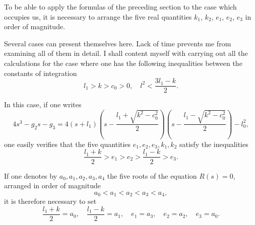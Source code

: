 \documentclass{article}
\begin{document}
To be able to apply the formulas of the preceding section to the case which occupies us, it is necessary to arrange the five real quantities $k_1$, $k_2$, $e_1$, $e_2$, $e_3$ in order of magnitude.

Several cases can present themselves here. Lack of time prevents me from examining all of them in detail. I shall content myself with carrying out all the calculations for the case where one has the following inequalities between the constants of integration
\[
l_1 > k > c_0 > 0, \quad l^2 < \frac{3l_1 - k}{2}.
\]

In this case, if one writes
\[
4s^3 - g_2s - g_3 = 4(s + l_1)\left(s - \frac{l_1 + \sqrt{k^2 - c_0^2}}{2}\right)\left(s - \frac{l_1 - \sqrt{k^2 - c_0^2}}{2}\right) - l_0^2,
\]
one easily verifies that the five quantities $e_1, e_2, e_3, k_1, k_2$ satisfy the inequalities
\[
\frac{l_1 + k}{2} > e_1 > e_2 > \frac{l_1 - k}{2} > e_3.
\]

If one denotes by $a_0, a_1, a_2, a_3, a_4$ the five roots of the equation $R(s) = 0$, arranged in order of magnitude
\[
a_0 < a_1 < a_2 < a_3 < a_4,
\]
it is therefore necessary to set
\[
\frac{l_1 + k}{2} = a_0, \quad \frac{l_1 - k}{2} = a_1, \quad e_1 = a_3, \quad e_2 = a_2, \quad e_3 = a_0.
\]
\end{document}
